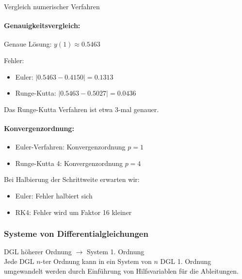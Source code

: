 \begin{example2}{Vergleich numerischer Verfahren}
\paragraph{Genauigkeitsvergleich:}
Genaue Lösung: $y(1) \approx 0.5463$

Fehler:
\begin{itemize}
    \item Euler: $|0.5463 - 0.4150| = 0.1313$
    \item Runge-Kutta: $|0.5463 - 0.5027| = 0.0436$
\end{itemize}
Das Runge-Kutta Verfahren ist etwa 3-mal genauer.

\paragraph{Konvergenzordnung:}
\begin{itemize}
    \item Euler-Verfahren: Konvergenzordnung $p = 1$
    \item Runge-Kutta 4: Konvergenzordnung $p = 4$
\end{itemize}

Bei Halbierung der Schrittweite erwarten wir:
\begin{itemize}
    \item Euler: Fehler halbiert sich
    \item RK4: Fehler wird um Faktor 16 kleiner
\end{itemize}
\end{example2}

\raggedcolumns
\columnbreak

\subsubsection{Systeme von Differentialgleichungen}

\begin{definition}{DGL höherer Ordnung $\rightarrow$ System 1. Ordnung}\\
  \small
Jede DGL $n$-ter Ordnung kann in ein System von $n$ DGL 1. Ordnung umgewandelt werden durch Einführung von Hilfsvariablen für die Ableitungen.
\end{definition}

